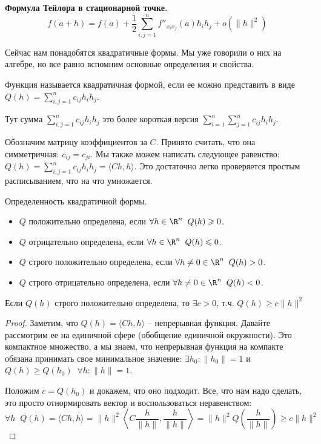 \textbf{Формула Тейлора в стационарной точке.}
\begin{equation*}
  f(a + h) = f(a) + \frac{1}{2} \sum\limits_{i, j = 1}^{n} f''_{x_i x_j}(a) h_i h_j + o(\| h \|^2)
\end{equation*}

Сейчас нам понадобятся квадратичные формы.
Мы уже говорили о них на алгебре, но все равно вспомним основные определения и свойства.
\begin{conj}
    Функция называется квадратичная формой, если ее можно представить в виде $Q(h) = \sum\limits_{i, j = 1}^n c_{ij}h_ih_j$.
\end{conj}
Тут сумма $\sum\limits_{i, j = 1}^n c_{ij}h_ih_j$ это более короткая версия $\sum\limits_{i=1}^n\sum\limits_{j=1}^n c_{ij}h_ih_j$.

Обозначим матрицу коэффициентов за $C$.
Принято считать, что она симметричная: $c_{ij} = c_{ji}$.
Мы также можем написать следующее равенство: $Q(h) = \sum\limits_{i, j = 1}^n c_{ij}h_ih_j = \langle Ch, h \rangle$.
Это достаточно легко проверяется простым расписыванием, что на что умножается.

\begin{conj} Определенность квадратичной формы.

    \begin{itemize}
        \item $Q$ положительно определена, если $\forall h \in \R^n \;\; Q(h) \geqslant 0$.
        \item $Q$ отрицательно определена, если $\forall h \in \R^n \;\; Q(h) \leqslant 0$.
        \item $Q$ строго положительно определена, если $\forall h \neq 0 \in \R^n \;\; Q(h) > 0$.
        \item $Q$ строго отрицательно определена, если $\forall h \neq 0 \in \R^n \;\; Q(h) < 0$. 
    \end{itemize}
\end{conj}

\vspace*{5mm}

\begin{lemma}
    Если $Q(h)$ строго положительно определена, то $\exists c > 0$, т.ч. $Q(h) \geqslant c\|h\|^2 $
\end{lemma}
\begin{proof}
    Заметим, что $Q(h) = \langle Ch, h \rangle$ -- непрерывная функция.
    Давайте рассмотрим ее на единичной сфере (обобщение единичной окружности).
    Это компактное множество, а мы знаем, что непрерывная функция на компакте обязана принимать свое минимальное значение: $\exists h_0 : \|h_0\| = 1$ и $Q(h) \geqslant Q(h_0) \;\; \forall h : \|h\| = 1$.
    
    Положим $c = Q(h_0)$ и докажем, что оно подходит.
    Все, что нам надо сделать, это просто отнормировать вектор и воспользоваться неравенством: \[ \forall h \;\; Q(h) = \langle Ch, h \rangle = \|h\|^2 \left\langle C \frac{h}{\|h\|}, \frac{h}{\|h\|} \right\rangle = \|h\|^2Q\left(\frac{h}{\|h\|}\right) \geqslant c\|h\|^2 \]
\end{proof}

